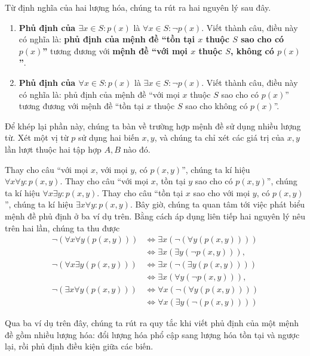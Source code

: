 Từ định nghĩa của hai lượng hóa, chúng ta rút ra hai nguyên lý sau đây.

\begin{enumerate}
    \item \textbf{Phủ định của $\exists x\in S : p(x)$} là $\forall x\in S: \neg p(x)$. Viết thành câu, điều này có nghĩa là: \textbf{phủ định của mệnh đề  ``tồn tại $x$ thuộc $S$ sao cho có $p(x)$''} tương đương với \textbf{mệnh đề ``với mọi $x$ thuộc $S$, không có $p(x)$''}.
    \item \textbf{Phủ định của $\forall x\in S : p(x)$} là $\exists x\in S: \neg p(x)$. Viết thành câu, điều này có nghĩa là: phủ định của mệnh đề  ``với mọi $x$ thuộc $S$ sao cho có $p(x)$'' tương đương với mệnh đề ``tồn tại $x$ thuộc $S$ sao cho không có $p(x)$''.
\end{enumerate}

Để khép lại phần này, chúng ta bàn về trường hợp mệnh đề sử dụng nhiều lượng từ. Xét một vị từ $p$ sử dụng hai biến $x, y$, và chúng ta chỉ xét các giá trị của $x, y$ lần lượt thuộc hai tập hợp $A, B$ nào đó.

Thay cho câu ``với mọi $x$, với mọi $y$, có $p(x, y)$'', chúng ta kí hiệu $\forall x\forall y : p(x, y)$. Thay cho câu ``với mọi $x$, tồn tại $y$ sao cho có $p(x, y)$'', chúng ta kí hiệu $\forall x \exists y : p(x,y)$. Thay cho câu ``tồn tại $x$ sao cho với mọi $y$, có $p(x, y)$'', chúng ta kí hiệu $\exists x \forall y : p(x, y)$. Bây giờ, chúng ta quan tâm tới việc phát biểu mệnh đề phủ định ở ba ví dụ trên. Bằng cách áp dụng liên tiếp hai nguyên lý nêu trên hai lần, chúng ta thu được
\begin{align*}
    \neg(\forall x \forall y (p(x, y))) & \Leftrightarrow \exists x (\neg(\forall y (p(x, y))))  \\
                                        & \Leftrightarrow \exists x (\exists y (\neg p(x, y))),  \\
    \neg(\forall x\exists y (p(x, y)))  & \Leftrightarrow \exists x (\neg(\exists y (p(x, y))))  \\
                                        & \Leftrightarrow \exists x (\forall y (\neg p(x, y))),  \\
    \neg(\exists x\forall y (p(x, y)))  & \Leftrightarrow \forall x (\neg(\forall y( p(x, y))))  \\
                                        & \Leftrightarrow \forall x (\exists y (\neg (p(x, y))))
\end{align*}

Qua ba ví dụ trên đây, chúng ta rút ra quy tắc khi viết phủ định của một mệnh đề gồm nhiều lượng hóa: đổi lượng hóa phổ cập sang lượng hóa tồn tại và ngược lại, rồi phủ định điều kiện giữa các biến.

